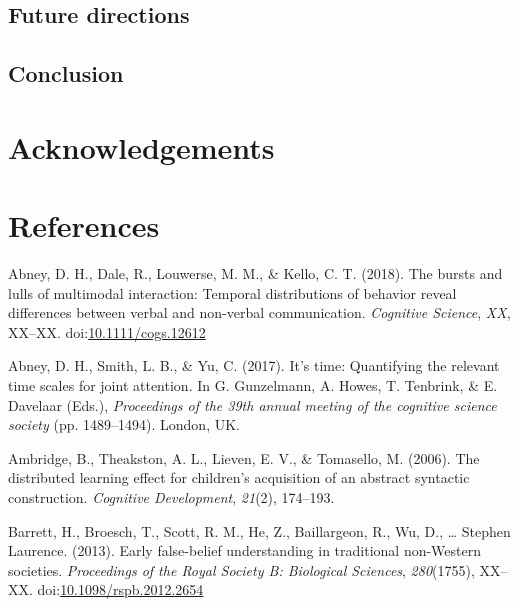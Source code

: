 \documentclass[floatsintext,man]{apa6}
\theoremstyle{definition}
\theoremstyle{definition}
\theoremstyle{definition}
\theoremstyle{remark}
\begin{document}
\subsection{Future directions}\label{disc-future}

\subsection{Conclusion}\label{disc-conclusion}

\section{Acknowledgements}\label{acknowledgements}

\newpage

\section{References}\label{refs}

\begingroup
\setlength{\parindent}{-0.5in} \setlength{\leftskip}{0.5in}

\hypertarget{refs}{}
\hypertarget{ref-abney2018bursts}{}
Abney, D. H., Dale, R., Louwerse, M. M., \& Kello, C. T. (2018). The
bursts and lulls of multimodal interaction: Temporal distributions of
behavior reveal differences between verbal and non-verbal communication.
\emph{Cognitive Science}, \emph{XX}, XX--XX.
doi:\href{https://doi.org/10.1111/cogs.12612}{10.1111/cogs.12612}

\hypertarget{ref-abney2017time}{}
Abney, D. H., Smith, L. B., \& Yu, C. (2017). It's time: Quantifying the
relevant time scales for joint attention. In G. Gunzelmann, A. Howes, T.
Tenbrink, \& E. Davelaar (Eds.), \emph{Proceedings of the 39th annual
meeting of the cognitive science society} (pp. 1489--1494). London, UK.

\hypertarget{ref-ambridge2006distributed}{}
Ambridge, B., Theakston, A. L., Lieven, E. V., \& Tomasello, M. (2006).
The distributed learning effect for children's acquisition of an
abstract syntactic construction. \emph{Cognitive Development},
\emph{21}(2), 174--193.

\hypertarget{ref-barrett2013early}{}
Barrett, H., Broesch, T., Scott, R. M., He, Z., Baillargeon, R., Wu, D.,
\ldots{} Stephen Laurence. (2013). Early false-belief understanding in
traditional non-Western societies. \emph{Proceedings of the Royal
Society B: Biological Sciences}, \emph{280}(1755), XX--XX.
doi:\href{https://doi.org/10.1098/rspb.2012.2654}{10.1098/rspb.2012.2654}
\end{document}
